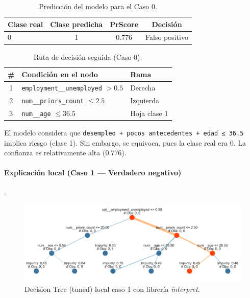 \begin{table}[h!]
\centering
\caption{Predicción del modelo para el Caso 0.}
\label{tab:local-pred-caso0}
\small
\begin{tabular}{@{}lccc@{}}
\toprule
\textbf{Clase real} & \textbf{Clase predicha} & \textbf{PrScore} & \textbf{Decisión} \\
\midrule
0 & 1 & 0.776 & Falso positivo \\
\bottomrule
\end{tabular}
\end{table}

\begin{table}[h!]
\centering
\caption{Ruta de decisión seguida (Caso 0).}
\label{tab:local-path-caso0}
\small
\begin{tabular}{@{}cll@{}}
\toprule
\# & \textbf{Condición en el nodo} & \textbf{Rama} \\
\midrule
1 & \texttt{employment\_\_unemployed} \(> 0.5\) & Derecha \\
2 & \texttt{num\_\_priors\_count} \(\le 2.5\)   & Izquierda \\
3 & \texttt{num\_\_age} \(\le 36.5\)            & Hoja clase 1 \\
\bottomrule
\end{tabular}
\end{table}

El modelo considera que \texttt{desempleo + pocos antecedentes + edad ≤ 36.5} implica riesgo (clase 1). Sin embargo, se equivoca, pues la clase real era 0. La confianza es relativamente alta (0.776).

\paragraph{Explicación local (Caso 1 — Verdadero negativo)}.

\begin{figure}[h!]
  \centering
  \includegraphics[width=0.92\linewidth]{figures/decision_tree_tunned_depth_local1.png}
  \caption{Decision Tree (tuned) local caso 1 con librería \textit{interpret}.}
  \label{fig:tree-tuned_local1}
\end{figure}

